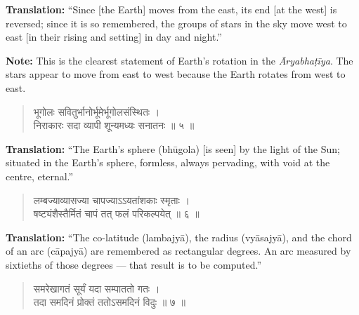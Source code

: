 \documentclass[11pt,a4paper]{article}
\newcommand{\dev}[1]{{\devanagarifont #1}}
\newenvironment{sanskritverse}{\begin{verse}\devanagarifont\large\centering}{\end{verse}}
\begin{document}
\vspace{0.3cm}
\noindent\textbf{Translation:} ``Since [the Earth] moves from the east, its end [at the west] is reversed; since it is so remembered, the groups of stars in the sky move west to east [in their rising and setting] in day and night.''

\smallskip
\noindent\textbf{Note:} This is the clearest statement of Earth's rotation in the \textit{Āryabhaṭīya}. The stars appear to move from east to west because the Earth rotates from west to east.

\vspace{0.5cm}

\begin{tcolorbox}[colback=white,colframe=rulecolor,title={\dev{\textbf{गोल ५ — भूगोलस्य वृत्ताकारत्वम् (The Earth is Spherical)}}}]
\begin{sanskritverse}
\dev{भूगोलः सवितुर्भानोर्भूमेर्भूगोलसंस्थितः ।\\
निराकारः सदा व्यापी शून्यमध्यः सनातनः ॥ ५ ॥}
\end{sanskritverse}
\end{tcolorbox}

\vspace{0.3cm}
\noindent\textbf{Translation:} ``The Earth's sphere (bhūgola) [is seen] by the light of the Sun; situated in the Earth's sphere, formless, always pervading, with void at the centre, eternal.''

\vspace{0.5cm}

\begin{tcolorbox}[colback=white,colframe=rulecolor,title={\dev{\textbf{गोल ६ — लम्बज्या (Co-latitude)}}}]
\begin{sanskritverse}
\dev{लम्बज्याव्यासज्या चापज्याऽऽयतांशकाः स्मृताः ।\\
षष्ट्यंशैस्तैर्मितं चापं तत् फलं परिकल्पयेत् ॥ ६ ॥}
\end{sanskritverse}
\end{tcolorbox}

\vspace{0.3cm}
\noindent\textbf{Translation:} ``The co-latitude (lambajyā), the radius (vyāsajyā), and the chord of an arc (cāpajyā) are remembered as rectangular degrees. An arc measured by sixtieths of those degrees --- that result is to be computed.''

\vspace{0.5cm}

\begin{tcolorbox}[colback=white,colframe=rulecolor,title={\dev{\textbf{गोल ७ — समदिनगतिः (Equinoxial Day)}}}]
\begin{sanskritverse}
\dev{समरेखागतं सूर्यं यदा सम्पाततो गतः ।\\
तदा समदिनं प्रोक्तं ततोऽसमदिनं विदुः ॥ ७ ॥}
\end{sanskritverse}
\end{tcolorbox}
\end{document}

